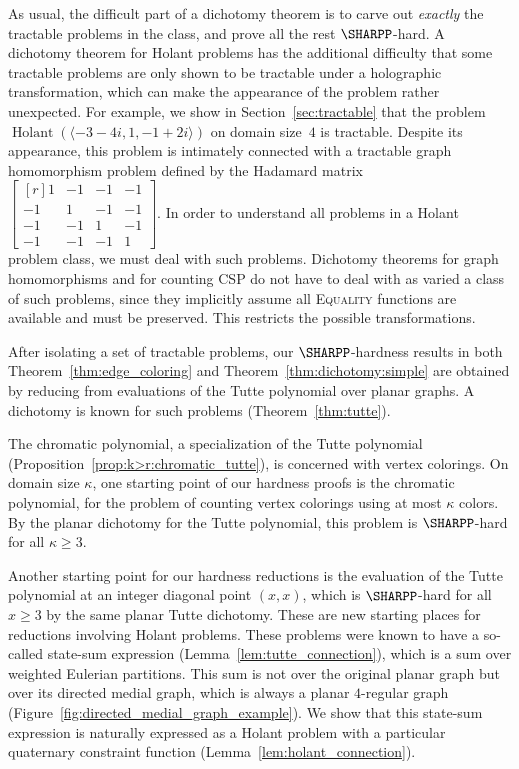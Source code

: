 \documentclass[11pt]{article}
\newcommand{\Holant}{\operatorname{Holant}}
\begin{document}
As usual,
the difficult part of a dichotomy theorem is to carve out \emph{exactly} the tractable problems in the class,
and prove all the rest $\SHARPP$-hard.
A dichotomy theorem for Holant problems has the additional difficulty that
some tractable problems are only shown to be tractable under a holographic transformation,
which can make the appearance of the problem rather unexpected.
For example,
we show in Section~\ref{sec:tractable} that the problem
$\Holant(\langle -3 - 4 i, 1, -1 +  2 i \rangle)$ on domain size~$4$ is tractable.
Despite its appearance,
this problem is intimately connected with a tractable graph homomorphism problem defined by the Hadamard matrix
$\left[\begin{smallmatrix*}[r] 1 & -1 & -1 & -1 \\ -1 & 1 & -1 & -1 \\ -1 & -1 & 1 & -1 \\ -1 & -1 & -1 & 1 \end{smallmatrix*}\right]$.
In order to understand all problems in a Holant problem class,
we must deal with such problems.
Dichotomy theorems for graph homomorphisms and for counting CSP do not have to deal with as varied a class of such problems,
since they implicitly assume all \textsc{Equality} functions are available and must be preserved.
This restricts the possible transformations.

After isolating a set of tractable problems,
our $\SHARPP$-hardness results in both Theorem~\ref{thm:edge_coloring} and Theorem~\ref{thm:dichotomy:simple}
are obtained by reducing from evaluations of the Tutte polynomial over planar graphs.
A dichotomy is known for such problems (Theorem~\ref{thm:tutte}).

The chromatic polynomial, 
a specialization of the Tutte polynomial (Proposition~\ref{prop:k>r:chromatic_tutte}),
is concerned with vertex colorings.
On domain size $\kappa$,
one starting point of our hardness proofs is the chromatic polynomial,
for the problem of counting vertex colorings using at most $\kappa$ colors.
By the planar dichotomy for the Tutte polynomial,
this problem is $\SHARPP$-hard for all $\kappa \ge 3$.

Another starting point for our hardness reductions is the evaluation of the Tutte polynomial at an integer diagonal point $(x,x)$,
which is $\SHARPP$-hard for all $x \ge 3$ by the same planar Tutte dichotomy.
These are new starting places for reductions involving Holant problems.
These problems were known to have a so-called state-sum expression (Lemma~\ref{lem:tutte_connection}),
which is a sum over weighted Eulerian partitions.
This sum is not over the original planar graph but over its directed medial graph,
which is always a planar $4$-regular graph (Figure~\ref{fig:directed_medial_graph_example}).
We show that this state-sum expression is naturally expressed as a Holant problem with a particular quaternary constraint function (Lemma~\ref{lem:holant_connection}).
\end{document}
